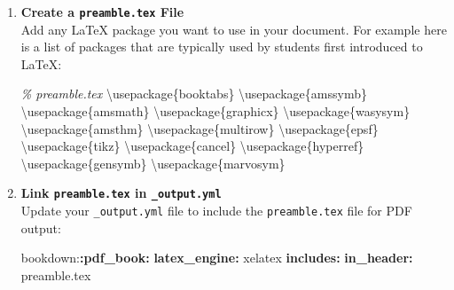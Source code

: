 \documentclass[
]{book}
\newenvironment{Shaded}{\begin{snugshade}}{\end{snugshade}}
\newcommand{\AttributeTok}[1]{\textcolor[rgb]{0.13,0.29,0.53}{#1}}
\newcommand{\BuiltInTok}[1]{#1}
\newcommand{\CommentTok}[1]{\textcolor[rgb]{0.56,0.35,0.01}{\textit{#1}}}
\newcommand{\ExtensionTok}[1]{#1}
\newcommand{\FunctionTok}[1]{\textcolor[rgb]{0.13,0.29,0.53}{\textbf{#1}}}
\newcommand{\KeywordTok}[1]{\textcolor[rgb]{0.13,0.29,0.53}{\textbf{#1}}}
\newcommand{\NormalTok}[1]{#1}
\theoremstyle{definition}
\theoremstyle{definition}
\theoremstyle{definition}
\theoremstyle{definition}
\theoremstyle{remark}
\begin{document}
\begin{enumerate}
\def\labelenumi{\arabic{enumi}.}
\item
  \textbf{Create a \texttt{preamble.tex} File}\\
  Add any LaTeX package you want to use in your document. For example here is a list of packages that are typically used by students first introduced to LaTeX:

\begin{Shaded}
\begin{Highlighting}[]
\CommentTok{\% preamble.tex}
\BuiltInTok{\textbackslash{}usepackage}\NormalTok{\{}\ExtensionTok{booktabs}\NormalTok{\}}
\BuiltInTok{\textbackslash{}usepackage}\NormalTok{\{}\ExtensionTok{amssymb}\NormalTok{\}}
\BuiltInTok{\textbackslash{}usepackage}\NormalTok{\{}\ExtensionTok{amsmath}\NormalTok{\}}
\BuiltInTok{\textbackslash{}usepackage}\NormalTok{\{}\ExtensionTok{graphicx}\NormalTok{\}}
\BuiltInTok{\textbackslash{}usepackage}\NormalTok{\{}\ExtensionTok{wasysym}\NormalTok{\}}
\BuiltInTok{\textbackslash{}usepackage}\NormalTok{\{}\ExtensionTok{amsthm}\NormalTok{\}}
\BuiltInTok{\textbackslash{}usepackage}\NormalTok{\{}\ExtensionTok{multirow}\NormalTok{\}}
\BuiltInTok{\textbackslash{}usepackage}\NormalTok{\{}\ExtensionTok{epsf}\NormalTok{\}}
\BuiltInTok{\textbackslash{}usepackage}\NormalTok{\{}\ExtensionTok{tikz}\NormalTok{\}}
\BuiltInTok{\textbackslash{}usepackage}\NormalTok{\{}\ExtensionTok{cancel}\NormalTok{\}}
\BuiltInTok{\textbackslash{}usepackage}\NormalTok{\{}\ExtensionTok{hyperref}\NormalTok{\}}
\BuiltInTok{\textbackslash{}usepackage}\NormalTok{\{}\ExtensionTok{gensymb}\NormalTok{\}}
\BuiltInTok{\textbackslash{}usepackage}\NormalTok{\{}\ExtensionTok{marvosym}\NormalTok{\}}
\end{Highlighting}
\end{Shaded}
\item
  \textbf{Link \texttt{preamble.tex} in \texttt{\_output.yml}}\\
  Update your \texttt{\_output.yml} file to include the \texttt{preamble.tex} file for PDF output:

\begin{Shaded}
\begin{Highlighting}[]
\AttributeTok{bookdown:}\FunctionTok{:pdf\_book}\KeywordTok{:}
\AttributeTok{  }\FunctionTok{latex\_engine}\KeywordTok{:}\AttributeTok{ xelatex}
\AttributeTok{  }\FunctionTok{includes}\KeywordTok{:}
\AttributeTok{    }\FunctionTok{in\_header}\KeywordTok{:}\AttributeTok{ preamble.tex}
\end{Highlighting}
\end{Shaded}
\end{enumerate}
\end{document}
